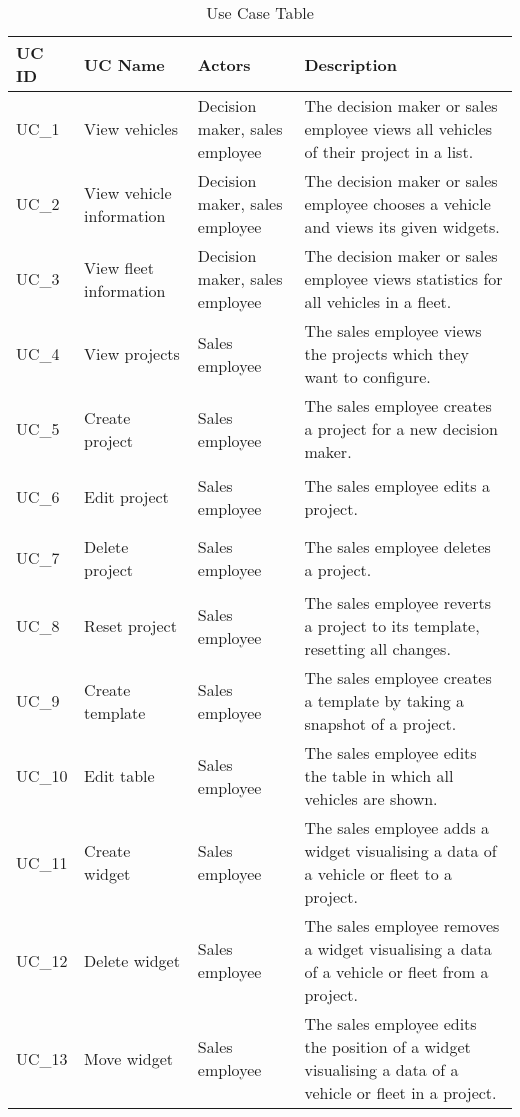 \sffamily
\begin{footnotesize}
  \renewcommand{\arraystretch}{1.4}
  \begin{longtable}[i i i L]{ p{} p{} p{} p{} }
    \caption                       %
        {Use Case Table} %
        \\
    \toprule
    \textbf{UC ID} & \textbf{UC Name} & \textbf{Actors}  & \textbf{Description}\\
    \midrule
    \hypertarget{Ref:UC1}{UC\_1} & View vehicles & Decision maker, sales employee & The decision maker or sales employee views all vehicles of their project in a list.\\
    \hypertarget{Ref:UC2}{UC\_2} & View vehicle information & Decision maker, sales employee & The decision maker or sales employee chooses a vehicle and views its given \glspl{widget}.\\
    \hypertarget{Ref:UC3}{UC\_3}  & View fleet information & Decision maker, sales employee & The decision maker or sales employee views statistics for all vehicles in a fleet.\\
    \hypertarget{Ref:UC4}{UC\_4}  & View projects & Sales employee & The sales employee views the projects which they want to configure.\\
    \hypertarget{Ref:UC5}{UC\_5} & Create project & Sales employee & The sales employee creates a project for a new decision maker.\\
    \hypertarget{Ref:UC6}{UC\_6} & Edit project & Sales employee & The sales employee edits a project.\\
    \hypertarget{Ref:UC7}{UC\_7} & Delete project & Sales employee & The sales employee deletes a project.\\
    \hypertarget{Ref:UC8}{UC\_8} & Reset project & Sales employee & The sales employee reverts a project to its template, resetting all changes.\\
    \hypertarget{Ref:UC9}{UC\_9} & Create template & Sales employee & The sales employee creates a template by taking a snapshot of a project.\\
    \hypertarget{Ref:UC10}{UC\_10} & Edit table & Sales employee & The sales employee edits the table in which all vehicles are shown.\\
    \hypertarget{Ref:UC11}{UC\_11} & Create \gls{widget} & Sales employee & The sales employee adds a \gls{widget} visualising a \gls{data} of a vehicle or fleet to a project.\\
    \hypertarget{Ref:UC12}{UC\_12} & Delete \gls{widget} & Sales employee & The sales employee removes a \gls{widget} visualising a \gls{data} of a vehicle or fleet from a project.\\
    \hypertarget{Ref:UC13}{UC\_13} & Move \gls{widget} & Sales employee & The sales employee edits the position of a \gls{widget} visualising a \gls{data} of a vehicle or fleet in a project.\\
    \bottomrule
  \end{longtable}
\end{footnotesize}
\rmfamily


